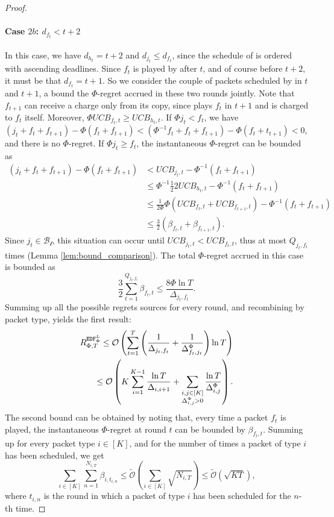 \begin{proof}
    \paragraph{Case $2b$: $d_{f_t}<t+2$} In this case, we have $d_{h_t}=t+2$ and $d_{j_t}\le d_{f_t}$, since the schedule of \opt is ordered with ascending deadlines. Since $f_t$ is played by \opt after $t$, and of course before $t+2$, it must be that $d_{f_t}=t+1$. So we consider the couple of packets scheduled by \alg in $t$ and $t+1$, a bound the $\Phi$-regret accrued in these two rounds jointly. Note that $f_{t+1}$ can receive a charge only from its copy, since \opt plays $f_t$ in $t+1$ and is charged to $f_t$ itself. Moreover, $\Phi UCB_{f_t,t} \ge UCB_{h_t,t}$. If $\Phi j_t < f_t$, we have $(j_t+f_t+f_{t+1})-\Phi (f_t + f_{t+1}) < (\Phi^{-1}f_t+f_t+f_{t+1})-\Phi(f_t+t_{t+1}) < 0$, and there is no $\Phi$-regret.
    If $\Phi j_t \ge f_t$, the instantaneous $\Phi$-regret can be bounded as 
    \begin{align*}
        (j_t+f_t+f_{t+1})-\Phi (f_t + f_{t+1}) &< UCB_{j_t,t} - \Phi^{-1}(f_t+f_{t+1}) \\
        & \le \Phi^{-1} \frac{1}{2} 2UCB_{h_t,t} - \Phi^{-1}(f_t+f_{t+1}) \\
        & \le \frac{1}{2\Phi} \Phi(UCB_{f_t,t} + UCB_{f_{t+1},t}) - \Phi^{-1}(f_t+f_{t+1}) \\
        & \le \frac{3}{2}(\beta_{f_t,t}+\beta_{f_{t+1},t}).
    \end{align*}
    Since $j_t \in \mathcal{B_t}$, this situation can occur until $UCB_{j_t,t} < UCB_{f_t,t}$, thus at most $Q_{j_t,f_t}$ times (Lemma \ref{lem:bound_comparison}). The total $\Phi$-regret accrued in this case is bounded as
    $$
    \frac{3}{2}\sum_{t=1}^{Q_{j_t,f_t}} \beta_{f_t,t} \le \frac{8\Phi\ln T}{\Delta_{j_t,f_t}}.
    $$
    Summing up all the possible regrets sources for every round, and recombining by packet type, yields the first result:
    \begin{align*}
        R_{\Phi,T}^{\text{\algedflearn}} \le \mathcal{O} \left(\sum_{t=1}^T \left(\frac{1}{\Delta_{j_t,f_t}} + \frac{1}{\Delta_{f_t,j_t}^\Phi} \right) \ln T\right) \\
        \le \mathcal{O}\left(K\sum_{i =1}^{K - 1} \frac{\ln T}{\Delta_{i, i+1}} + \sum_{\substack{i,j \in [K]\\ \Delta_{i,j}^\Phi > 0}} \frac{\ln T}{\Delta_{i,j}^\Phi}\right).
    \end{align*}
    The second bound can be obtained by noting that, every time a packet $f_t$ is played, the instantaneous $\Phi$-regret at round $t$ can be bounded by $\beta_{f_t,t}$. Summing up for every packet type $i\in [K]$, and for the number of times a packet of type $i$ has been scheduled, we get
    $$
    \sum_{i \in [K]} \sum_{n=1}^{N_{i,T}} \beta_{i,t_{i,n}} \le \widetilde{\mathcal{O}}\left( \sum_{i \in [K]}\sqrt{N_{i,T}} \right) \le \widetilde{\mathcal{O}}\left(\sqrt{KT}\right),
    $$ 
    where $t_{i,n}$ is the round in which a packet of type $i$ has been scheduled for the $n$-th time.
\end{proof}
